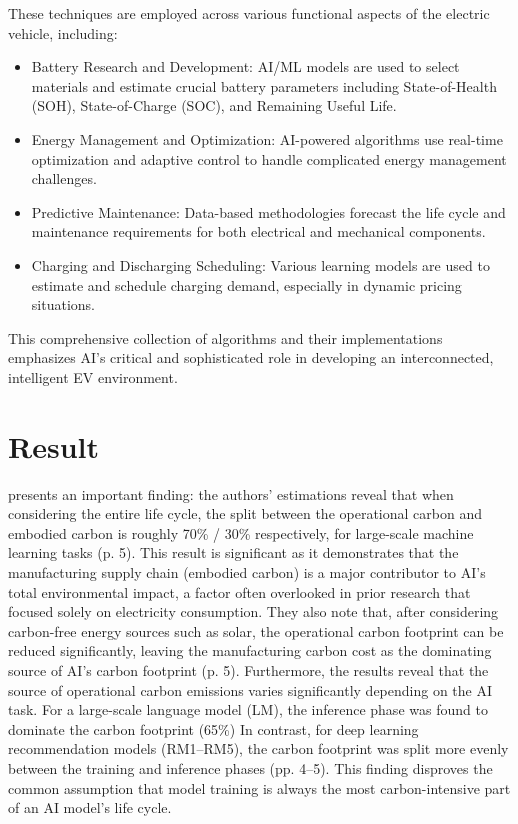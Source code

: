 \documentclass[a4paper, 12pt]{article}
\begin{document}
These techniques are employed across various functional aspects of the electric vehicle, including:
\begin{itemize}
    \item Battery Research and Development: AI/ML models are used to select materials and estimate crucial battery parameters including State-of-Health (SOH), State-of-Charge (SOC), and Remaining Useful Life.

    \item Energy Management and Optimization: AI-powered algorithms use real-time optimization and adaptive control to handle complicated energy management challenges.

    \item Predictive Maintenance: Data-based methodologies forecast the life cycle and maintenance requirements for both electrical and mechanical components.

    \item Charging and Discharging Scheduling: Various learning models are used to estimate and schedule charging demand, especially in dynamic pricing situations.
\end{itemize}
This comprehensive collection of algorithms and their implementations emphasizes AI's critical and sophisticated role in developing an interconnected, intelligent EV environment.

\section{Result}
\citet{Wu2022} presents an important finding: the authors' estimations reveal that when considering the entire life cycle, the split between the operational carbon and embodied carbon is roughly 70\% / 30\% respectively, for large-scale machine learning tasks (p. 5). This result is significant as it demonstrates that the manufacturing supply chain (embodied carbon) is a major contributor to AI's total environmental impact, a factor often overlooked in prior research that focused solely on electricity consumption. They also note that, after considering carbon-free energy sources such as solar, the operational carbon footprint can be reduced significantly, leaving the manufacturing carbon cost as the dominating source of AI's carbon footprint (p. 5). Furthermore, the results reveal that the source of operational carbon emissions varies significantly depending on the AI task. For a large-scale language model (LM), the inference phase was found to dominate the carbon footprint (65\%) In contrast, for deep learning recommendation models (RM1–RM5), the carbon footprint was split more evenly between the training and inference phases (pp. 4–5). This finding disproves the common assumption that model training is always the most carbon-intensive part of an AI model's life cycle.\hfill \break
\end{document}
